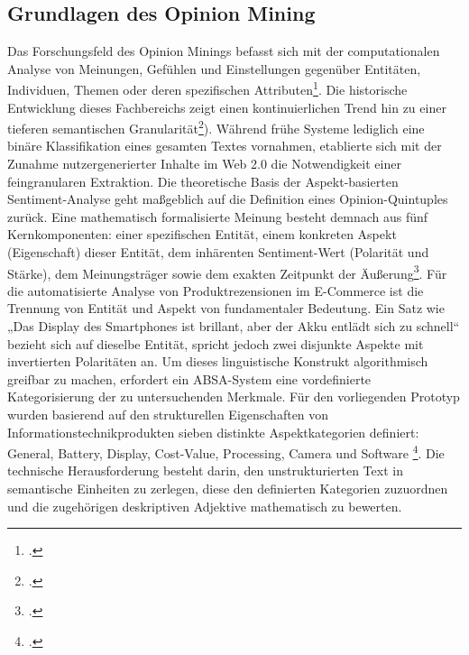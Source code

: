 \documentclass[12pt]{article}
\begin{document}
\subsection{Grundlagen des Opinion Mining}
Das Forschungsfeld des Opinion Minings befasst sich mit der computationalen Analyse von Meinungen, Gefühlen und Einstellungen gegenüber Entitäten, Individuen, Themen oder deren spezifischen Attributen\footcite[]{pang-2008}. Die historische Entwicklung dieses Fachbereichs zeigt einen kontinuierlichen Trend hin zu einer tieferen semantischen Granularität\footcite[]{bharathi-2025}). Während frühe Systeme lediglich eine binäre Klassifikation eines gesamten Textes vornahmen, etablierte sich mit der Zunahme nutzergenerierter Inhalte im Web 2.0 die Notwendigkeit einer feingranularen Extraktion. Die theoretische Basis der Aspekt-basierten Sentiment-Analyse geht maßgeblich auf die Definition eines Opinion-Quintuples zurück. Eine mathematisch formalisierte Meinung besteht demnach aus fünf Kernkomponenten: einer spezifischen Entität, einem konkreten Aspekt (Eigenschaft) dieser Entität, dem inhärenten Sentiment-Wert (Polarität und Stärke), dem Meinungsträger sowie dem exakten Zeitpunkt der Äußerung\footcite[]{liu-2011}. Für die automatisierte Analyse von Produktrezensionen im E-Commerce ist die Trennung von Entität und Aspekt von fundamentaler Bedeutung. Ein Satz wie „Das Display des Smartphones ist brillant, aber der Akku entlädt sich zu schnell“ bezieht sich auf dieselbe Entität, spricht jedoch zwei disjunkte Aspekte mit invertierten Polaritäten an. Um dieses linguistische Konstrukt algorithmisch greifbar zu machen, erfordert ein ABSA-System eine vordefinierte Kategorisierung der zu untersuchenden Merkmale. Für den vorliegenden Prototyp wurden basierend auf den strukturellen Eigenschaften von Informationstechnikprodukten sieben distinkte Aspektkategorien definiert: General, Battery, Display, Cost-Value, Processing, Camera und Software \footcite[44]{syawanodya-2025}. Die technische Herausforderung besteht darin, den unstrukturierten Text in semantische Einheiten zu zerlegen, diese den definierten Kategorien zuzuordnen und die zugehörigen deskriptiven Adjektive mathematisch zu bewerten.
\end{document}

